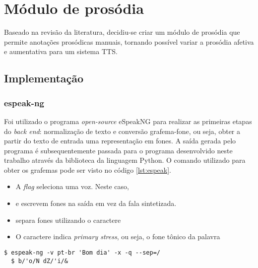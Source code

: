 
\simb[ms (milissegundos)]
\simb[Hz (Hertz)]

\chapter{Módulo de prosódia}
Baseado na revisão da literatura, decidiu-se criar um módulo de prosódia que
permite anotações prosódicas manuais, tornando possível variar a prosódia
afetiva e aumentativa para um sistema TTS.

\section{Implementação}
\subsection{espeak-ng}
Foi utilizado o programa \emph{open-source} eSpeakNG \cite{espeakng} para
realizar as primeiras etapas do \emph{back end}: normalização de texto e
conversão grafema-fone, ou seja, obter a partir do texto de entrada uma
representação em fones. A saída gerada pelo programa é subsequentemente passada
para o programa desenvolvido neste trabalho através da biblioteca
 da linguagem Python. O comando utilizado para obter os
grafemas pode ser visto no código
\ref{lst:espeak}.

\begin{itemize}
\item A \emph{flag}  seleciona uma voz. Neste caso, 
\item {} e  escrevem fones na saída em vez da fala sintetizada.
\item {} separa fones utilizando o caractere \code{/}
\item O caractere \code{\'} indica \emph{primary stress}, ou seja, o fone tônico
da palavra
\end{itemize}

\begin{lstlisting}[caption=Utilização do programa espeak e saída correspondente,
  label=lst:espeak]
  $ espeak-ng -v pt-br 'Bom dia' -x -q --sep=/
  $ b/'o/N dZ/'i/&
\end{lstlisting}


